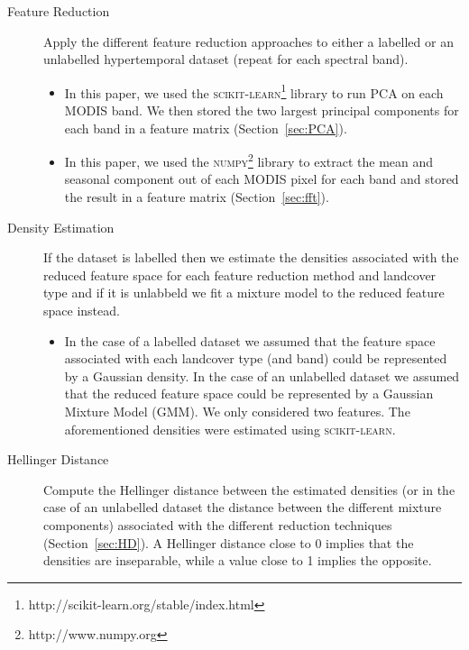 \documentclass{article}
\begin{document}
\begin{description}
 \item[Feature Reduction] Apply the different feature reduction approaches to either a labelled or an unlabelled hypertemporal dataset (repeat for each spectral band). 
 \begin{itemize}
  \item In this paper, we used the \textsc{scikit-learn}\footnote{http://scikit-learn.org/stable/index.html} library to run PCA on each MODIS band. We then stored the two largest principal components for each band in a feature matrix (Section~\ref{sec:PCA}). 
  \item In this paper, we used the \textsc{numpy}\footnote{http://www.numpy.org} library to extract the mean and seasonal component out of each MODIS pixel for each band and stored the result in a feature matrix (Section~\ref{sec:fft}). 
 \end{itemize}
 \item[Density Estimation] If the dataset is labelled then we estimate the densities associated with the reduced feature space for each feature reduction method and landcover type and if 
 it is unlabbeld we fit a mixture model to the reduced feature space instead.
 \begin{itemize}
  \item In the case of a labelled dataset 
  we assumed that the feature space associated with each landcover type (and band) could be represented by a Gaussian density. In the case 
  of an unlabelled dataset we assumed that the reduced feature space could be represented by a Gaussian Mixture Model (GMM). We only considered two features. The aforementioned densities were estimated 
  using \textsc{scikit-learn}.
 \end{itemize}
 \item[Hellinger Distance] Compute the Hellinger distance between the estimated densities (or in the case of an unlabelled dataset the distance between the different mixture components) associated with the different reduction techniques (Section~\ref{sec:HD}).
 A Hellinger distance close to 0 implies that the densities are inseparable, while a value close to 1 implies the opposite.
\end{description}
\end{document}

